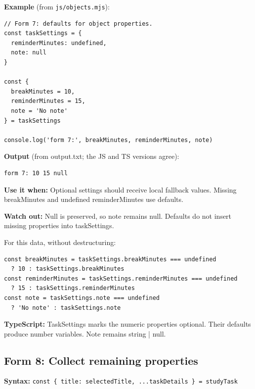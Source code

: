 \documentclass[10pt,a4paper]{article}
\begin{document}

\textbf{Example} (from \texttt{js/\allowbreak{}objects.\allowbreak{}mjs}):

\begin{lstlisting}[language=GuideJS]
// Form 7: defaults for object properties.
const taskSettings = {
  reminderMinutes: undefined,
  note: null
}

const {
  breakMinutes = 10,
  reminderMinutes = 15,
  note = 'No note'
} = taskSettings

console.log('form 7:', breakMinutes, reminderMinutes, note)
\end{lstlisting}


\textbf{Output} (from output.txt; the JS and TS versions agree):

\begin{lstlisting}[language={}]
form 7: 10 15 null
\end{lstlisting}

\textbf{Use it when:} Optional settings should receive local fallback values. Missing breakMinutes and undefined reminderMinutes use defaults.

\textbf{Watch out:} Null is preserved, so note remains null. Defaults do not insert missing properties into taskSettings.


For this data, without destructuring:

\begin{lstlisting}[language=GuideJS]
const breakMinutes = taskSettings.breakMinutes === undefined
  ? 10 : taskSettings.breakMinutes
const reminderMinutes = taskSettings.reminderMinutes === undefined
  ? 15 : taskSettings.reminderMinutes
const note = taskSettings.note === undefined
  ? 'No note' : taskSettings.note
\end{lstlisting}

\textbf{TypeScript:} TaskSettings marks the numeric properties optional. Their defaults produce number variables. Note remains string | null.

\subsection{Form 8: Collect remaining properties}

\textbf{Syntax:} \texttt{const \{ title:\allowbreak{} selected\allowbreak{}Title,\allowbreak{} .\allowbreak{}.\allowbreak{}.\allowbreak{}task\allowbreak{}Details \} =\allowbreak{} study\allowbreak{}Task}
\end{document}
